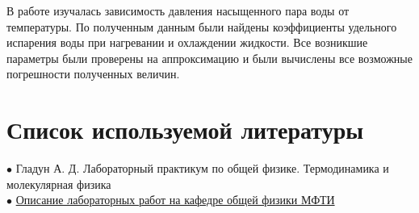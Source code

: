 \documentclass[a4paper, 12pt]{article} %
\begin{document}
В работе изучалась зависимость давления насыщенного пара воды от температуры. По полученным данным были найдены коэффициенты удельного испарения воды при нагревании и охлаждении жидкости. Все возникшие параметры были проверены на аппроксимацию и были вычислены все возможные погрешности полученных величин.

\section{Список используемой литературы}

$\bullet$ Гладун А. Д. Лабораторный практикум по общей физике. Термодинамика и молекулярная физика\\

$\bullet$ \href{https://mipt.ru/education/chair/physics/S_II/lab/}{Описание лабораторных работ на кафедре общей физики МФТИ}
\end{document}
